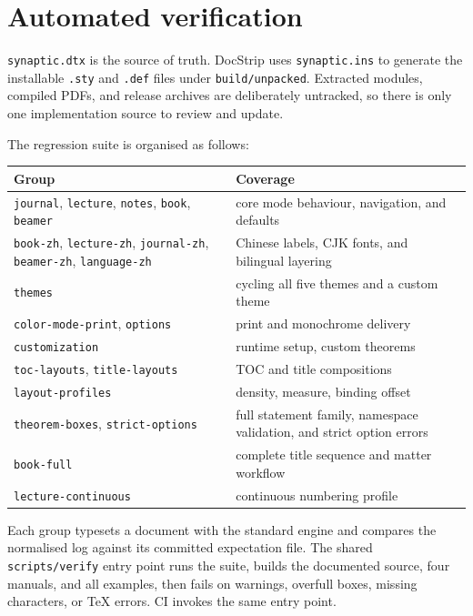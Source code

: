 \documentclass[a4paper,11pt]{scrartcl}
\begin{document}
\section{Automated verification}

\texttt{synaptic.dtx} is the source of truth. DocStrip uses
\texttt{synaptic.ins} to generate the installable \texttt{.sty} and
\texttt{.def} files under \texttt{build/unpacked}. Extracted modules, compiled
PDFs, and release archives are deliberately untracked, so there is only one
implementation source to review and update.

The regression suite is organised as follows:

{\setlength{\parindent}{0pt}\noindent\begin{tabularx}{\textwidth}{@{}l Y@{}}
  \toprule
  \textbf{Group} & \textbf{Coverage} \\
  \midrule
  \texttt{journal}, \texttt{lecture}, \texttt{notes}, \texttt{book},
  \texttt{beamer} & core
  mode behaviour, navigation, and defaults \\
  \texttt{book-zh}, \texttt{lecture-zh}, \texttt{journal-zh}, \texttt{beamer-zh},
  \texttt{language-zh} & Chinese labels, CJK fonts, and bilingual layering \\
  \texttt{themes} & cycling all five themes and a custom theme \\
  \texttt{color-mode-print}, \texttt{options} & print and monochrome delivery \\
  \texttt{customization} & runtime setup, custom theorems \\
  \texttt{toc-layouts}, \texttt{title-layouts} & TOC and title compositions \\
  \texttt{layout-profiles} & density, measure, binding offset \\
  \texttt{theorem-boxes}, \texttt{strict-options} & full statement family,
  namespace validation, and strict option errors \\
  \texttt{book-full} & complete title sequence and matter workflow \\
  \texttt{lecture-continuous} & continuous numbering profile \\
  \bottomrule
\end{tabularx}}

Each group typesets a document with the standard engine and compares the
normalised log against its committed expectation file. The shared
\texttt{scripts/verify} entry point runs the suite, builds the documented
source, four manuals, and all examples, then fails on warnings, overfull boxes,
missing characters, or TeX errors. CI invokes the same entry point.
\end{document}
